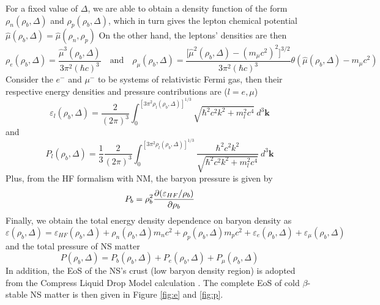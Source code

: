 For a fixed value of $\Delta$, we are able to obtain a density function of the form $\rho_n (\rho_b, \Delta)$ and $\rho_p (\rho_b, \Delta)$, which in turn gives the lepton chemical potential $\hat{\mu}(\rho_b,\Delta) = \hat{\mu}(\rho_n,\rho_p)$ On the other hand, the leptons' densities are then \cite{loan2011equation}
\begin{equation}
        \rho_e(\rho_b,\Delta) = \frac{ \hat{\mu}^3(\rho_b,\Delta)}{ 3\pi^2 (\hbar c)^3} \quad\text{and}\quad \rho_\mu(\rho_b,\Delta) = \frac{ \Big[\hat{\mu}^2(\rho_b,\Delta) - (m_\mu c^2)^2\Big]^{3/2}}{ 3\pi^2 (\hbar c)^3} \theta(\hat{\mu}(\rho_b,\Delta)-m_\mu c^2)
\end{equation} 
Consider the $e^-$ and $\mu^-$ to be systems of relativistic Fermi gas, then their respective energy densities and pressure contributions are ($l=e,\mu$) \citep{moustakidis2009equation}
\begin{equation}
        \varepsilon_l(\rho_b,\Delta) = \frac{ 2}{ (2\pi)^3} \int_{{0}}^{{[3\pi^2\rho_l(\rho_b,\Delta)]^{1/3}}} {\sqrt{\hbar^2 c^2 k^2 + m_l^2 c^4}} \: d^3{\mathbf{k}}
\end{equation} 
and
\begin{equation}
        P_l(\rho_b,\Delta) = \frac{ 1}{ 3} \frac{ 2}{ (2\pi)^3} \int_{{0}}^{{[3\pi^2 \rho_l(\rho_b,\Delta)]^{1/3}}} { \frac{ \hbar^2 c^2 k^2}{ \sqrt{\hbar^2 c^2 k^2 + m_l^2 c^4}} } \: d^3{\mathbf{k}}
\end{equation} 
Plus, from the \gls{HF} formalism with \gls{NM}, the baryon pressure is given by
\begin{equation}
        P_b = \rho_b^2 \pdv{(\varepsilon_{HF}/\rho_b)}{\rho_b}
\end{equation}
Finally, we obtain the total energy density dependence on baryon density as 
\begin{equation}
        \varepsilon(\rho_b,\Delta) = \varepsilon_{HF}(\rho_b,\Delta) + \rho_n(\rho_b,\Delta)m_n c^2 + \rho_p(\rho_b,\Delta)m_p c^2 + \varepsilon_e(\rho_b,\Delta) + \varepsilon_\mu(\rho_b,\Delta)
\end{equation}
and the total pressure of \gls{NS} matter
\begin{equation}
        P(\rho_b,\Delta) = P_b(\rho_b,\Delta) + P_e(\rho_b,\Delta) + P_\mu(\rho_b,\Delta)
\end{equation}
In addition, the \gls{EoS} of the \gls{NS}'s crust (low baryon density region) is adopted from the Compress Liquid Drop Model calculation \citep{douchin2000nuclear,douchin2001unified}. The complete \gls{EoS} of cold $\beta$-stable \gls{NS} matter is then given in Figure \ref{fig:e} and \ref{fig:p}.
